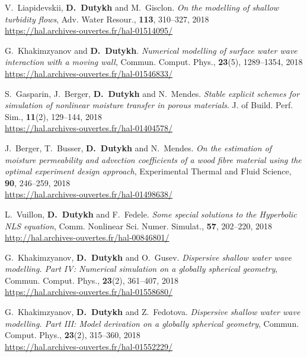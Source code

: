 \begin{etaremune}
  \item V.~Liapidevskii, \textbf{D.~Dutykh} and M.~Gisclon. \textit{On the modelling of shallow turbidity flows}, Adv. Water Resour., \textbf{113}, 310--327, 2018 \\ %
  \url{https://hal.archives-ouvertes.fr/hal-01514095/}

  \item G.~Khakimzyanov and \textbf{D.~Dutykh}. \textit{Numerical modelling of surface water wave interaction with a moving wall}, Commun. Comput. Phys., \textbf{23}(5), 1289--1354, 2018 \\ %
  \url{https://hal.archives-ouvertes.fr/hal-01546833/}

  \item S.~Gasparin, J.~Berger, \textbf{D.~Dutykh} and N.~Mendes. \textit{Stable explicit schemes for simulation of nonlinear moisture transfer in porous materials}. J. of Build. Perf. Sim., \textbf{11}(2), 129--144, 2018 \\ %
  \url{https://hal.archives-ouvertes.fr/hal-01404578/}

  \item J.~Berger, T.~Busser, \textbf{D.~Dutykh} and N.~Mendes. \textit{On the estimation of moisture permeability and advection coefficients of a wood fibre material using the optimal experiment design approach}, Experimental Thermal and Fluid Science, \textbf{90}, 246--259, 2018 \\ %
  \url{https://hal.archives-ouvertes.fr/hal-01498638/}
  
  \item L.~Vuillon, \textbf{D.~Dutykh} and F.~Fedele. \textit{Some special solutions to the Hyperbolic NLS equation}, Comm. Nonlinear Sci. Numer. Simulat., \textbf{57}, 202--220, 2018 \\ %
  \url{http://hal.archives-ouvertes.fr/hal-00846801/}

  \item G.~Khakimzyanov, \textbf{D.~Dutykh} and O.~Gusev. \textit{Dispersive shallow water wave modelling. Part IV: Numerical simulation on a globally spherical geometry}, Commun. Comput. Phys., \textbf{23}(2), 361--407, 2018 \\ %
  \url{https://hal.archives-ouvertes.fr/hal-01558680/}

  \item G.~Khakimzyanov, \textbf{D.~Dutykh} and Z.~Fedotova. \textit{Dispersive shallow water wave modelling. Part III: Model derivation on a globally spherical geometry}, Commun. Comput. Phys., \textbf{23}(2), 315--360, 2018 \\ %
  \url{https://hal.archives-ouvertes.fr/hal-01552229/}


\end{etaremune}
